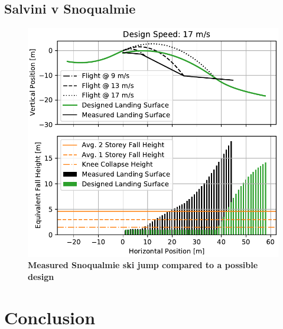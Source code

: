 \documentclass{article}
\begin{document}
\subsection{Salvini v Snoqualmie}
\begin{figure}
  \centering
  \includegraphics[width=5.25in]{figures/salvini-v-snoqualmie.pdf}
  \caption{\textbf{Measured Snoqualmie ski jump compared to a possible design}}
  \label{fig:salvini-v-snoqualmie}
\end{figure}

\section{Conclusion}
%


\end{document}
